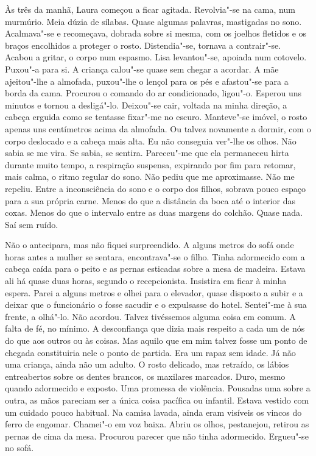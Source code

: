 Às três da manhã, Laura começou a ficar agitada. Revolvia"-se na cama,
num murmúrio. Meia dúzia de sílabas. Quase algumas palavras, mastigadas
no sono. Acalmava"-se e recomeçava, dobrada sobre si mesma, com os
joelhos fletidos e os braços encolhidos a proteger o rosto.
Distendia"-se, tornava a contrair"-se. Acabou a gritar, o corpo num
espasmo. Lisa levantou"-se, apoiada num cotovelo. Puxou"-a para si. A
criança calou"-se quase sem chegar a acordar. A mãe ajeitou"-lhe a
almofada, puxou"-lhe o lençol para os pés e afastou"-se para a borda da
cama. Procurou o comando do ar condicionado, ligou"-o. Esperou uns
minutos e tornou a desligá"-lo. Deixou"-se cair, voltada na minha
direção, a cabeça erguida como se tentasse fixar"-me no escuro.
Manteve"-se imóvel, o rosto apenas uns centímetros acima da almofada. Ou
talvez novamente a dormir, com o corpo deslocado e a cabeça mais alta.
Eu não conseguia ver"-lhe os olhos. Não sabia se me vira. Se sabia, se
sentira. Pareceu"-me que ela permaneceu hirta durante muito tempo, a
respiração suspensa, expirando por fim para retomar, mais calma, o ritmo
regular do sono. Não pediu que me aproximasse. Não me repeliu. Entre a
inconsciência do sono e o corpo dos filhos, sobrava pouco espaço para a
sua própria carne. Menos do que a distância da boca até o interior das
coxas. Menos do que o intervalo entre as duas margens do colchão. Quase
nada. Saí sem ruído.

Não o antecipara, mas não fiquei surpreendido. A alguns metros do sofá
onde horas antes a mulher se sentara, encontrava"-se o filho. Tinha
adormecido com a cabeça caída para o peito e as pernas esticadas sobre a
mesa de madeira. Estava ali há quase duas horas, segundo o
recepcionista. Insistira em ficar à minha espera. Parei a alguns metros
e olhei para o elevador, quase disposto a subir e a deixar que o
funcionário o fosse sacudir e o expulsasse do hotel. Sentei"-me à sua
frente, a olhá"-lo. Não acordou. Talvez tivéssemos alguma coisa em
comum. A falta de fé, no mínimo. A desconfiança que dizia mais respeito
a cada um de nós do que aos outros ou às coisas. Mas aquilo que em mim
talvez fosse um ponto de chegada constituiria nele o ponto de partida.
Era um rapaz sem idade. Já não uma criança, ainda não um adulto. O rosto
delicado, mas retraído, os lábios entreabertos sobre os dentes brancos,
os maxilares marcados. Duro, mesmo quando adormecido e exposto. Uma
promessa de violência. Pousadas uma sobre a outra, as mãos pareciam ser
a única coisa pacífica ou infantil. Estava vestido com um cuidado pouco
habitual. Na camisa lavada, ainda eram visíveis os vincos do ferro de
engomar. Chamei"-o em voz baixa. Abriu os olhos, pestanejou, retirou as
pernas de cima da mesa. Procurou parecer que não tinha adormecido.
Ergueu"-se no sofá.

